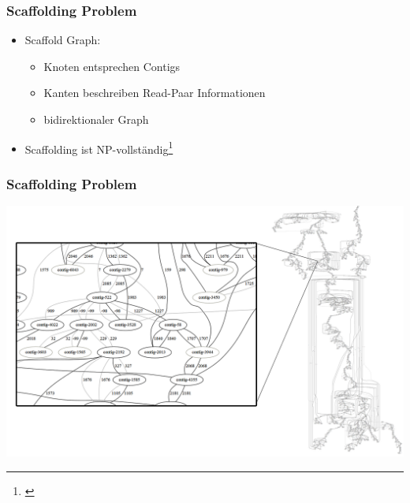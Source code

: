 \documentclass[xcolor=pst]{beamer}
\begin{document}

\begin{frame} %
  \frametitle{Scaffolding Problem}
  \begin{itemize}
  \item Scaffold Graph:
    \begin{itemize}
    \item Knoten entsprechen Contigs
    \item Kanten beschreiben Read-Paar
      Informationen
    \item bidirektionaler Graph
    \end{itemize}
  \item Scaffolding ist NP-vollständig\footnote{\cite{Huson:2002kf}}
  \end{itemize}
\end{frame}

\begin{frame}
  \frametitle{Scaffolding Problem}
  \begin{center}
    \includegraphics[width=\textwidth,height=\textheight,keepaspectratio]{figures/Scaffolding_graph.png}
  \end{center}
\end{frame}
\end{document}
